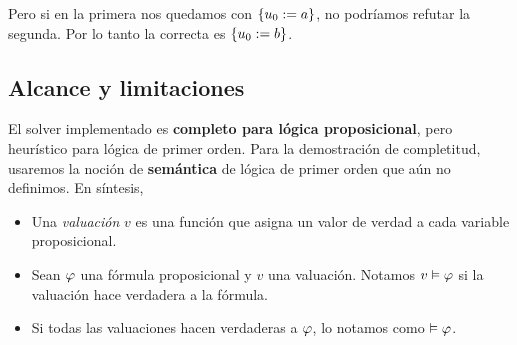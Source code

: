 Pero si en la primera nos quedamos con $\{u_0 := a\}$, no podríamos refutar la segunda. Por lo tanto la correcta es $\{u_0 := b\}$.

\subsection{Alcance y limitaciones}
\label{ppa-cert:sec:expressiveness}

El solver implementado es \textbf{completo para lógica proposicional}, pero heurístico para lógica de primer orden. Para la demostración de completitud, usaremos la noción de \textbf{semántica} de lógica de primer orden que aún no definimos. En síntesis,

\begin{itemize}
    \item Una \textit{valuación} $v$ es una función que asigna un valor de verdad a cada variable proposicional.
    \item Sean $\varphi$ una fórmula proposicional y $v$ una valuación. Notamos $v \vDash \varphi$ si la valuación hace verdadera a la fórmula.
    \item Si todas las valuaciones hacen verdaderas a $\varphi$, lo notamos como $\vDash \varphi$.
\end{itemize}

